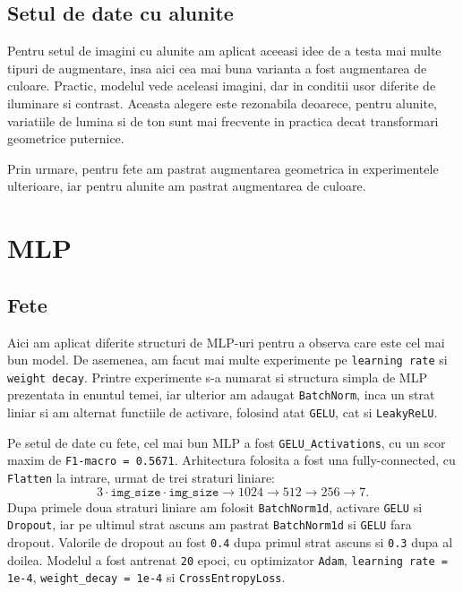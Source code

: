 \documentclass[12pt,a4paper]{article}
\begin{document}
\subsection{Setul de date cu alunite}

Pentru setul de imagini cu alunite am aplicat aceeasi idee de a testa mai multe tipuri de augmentare, insa aici cea mai buna varianta a fost augmentarea de culoare. Practic, modelul vede aceleasi imagini, dar in conditii usor diferite de iluminare si contrast. Aceasta alegere este rezonabila deoarece, pentru alunite, variatiile de lumina si de ton sunt mai frecvente in practica decat transformari geometrice puternice.

Prin urmare, pentru fete am pastrat augmentarea geometrica in experimentele ulterioare, iar pentru alunite am pastrat augmentarea de culoare.

\section{MLP}

\subsection{Fete}

Aici am aplicat diferite structuri de MLP-uri pentru a observa care este cel mai bun model. De asemenea, am facut mai multe experimente pe \texttt{learning rate} si \texttt{weight decay}. Printre experimente s-a numarat si structura simpla de MLP prezentata in enuntul temei, iar ulterior am adaugat \texttt{BatchNorm}, inca un strat liniar si am alternat functiile de activare, folosind atat \texttt{GELU}, cat si \texttt{LeakyReLU}.

Pe setul de date cu fete, cel mai bun MLP a fost \texttt{GELU\_Activations}, cu un scor maxim de \texttt{F1-macro = 0.5671}. Arhitectura folosita a fost una fully-connected, cu \texttt{Flatten} la intrare, urmat de trei straturi liniare:
\[
3 \cdot \texttt{img\_size} \cdot \texttt{img\_size} \rightarrow 1024 \rightarrow 512 \rightarrow 256 \rightarrow 7.
\]
Dupa primele doua straturi liniare am folosit \texttt{BatchNorm1d}, activare \texttt{GELU} si \texttt{Dropout}, iar pe ultimul strat ascuns am pastrat \texttt{BatchNorm1d} si \texttt{GELU} fara dropout. Valorile de dropout au fost \texttt{0.4} dupa primul strat ascuns si \texttt{0.3} dupa al doilea. Modelul a fost antrenat \texttt{20} epoci, cu optimizator \texttt{Adam}, \texttt{learning rate = 1e-4}, \texttt{weight\_decay = 1e-4} si \texttt{CrossEntropyLoss}.
\end{document}
